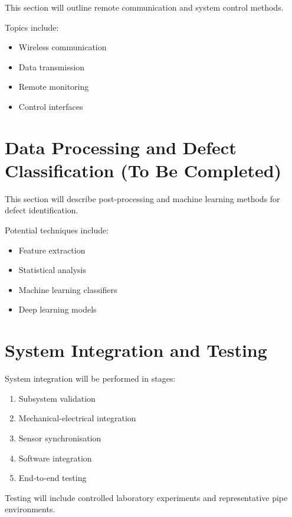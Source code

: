 \documentclass[11pt,a4paper]{article}
\begin{document}
This section will outline remote communication and system control methods.

Topics include:

\begin{itemize}
  \item Wireless communication
  \item Data transmission
  \item Remote monitoring
  \item Control interfaces
\end{itemize}

\section{Data Processing and Defect Classification (To Be Completed)}

This section will describe post-processing and machine learning methods for defect identification.

Potential techniques include:

\begin{itemize}
  \item Feature extraction
  \item Statistical analysis
  \item Machine learning classifiers
  \item Deep learning models
\end{itemize}

\section{System Integration and Testing}

System integration will be performed in stages:

\begin{enumerate}
  \item Subsystem validation
  \item Mechanical-electrical integration
  \item Sensor synchronisation
  \item Software integration
  \item End-to-end testing
\end{enumerate}

Testing will include controlled laboratory experiments and representative pipe environments.

\end{document}
